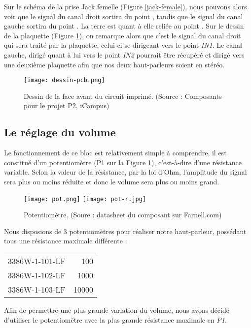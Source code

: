 Sur le schéma de la prise Jack femelle (Figure \ref{jack-female}), nous pouvons alors
voir que le signal du canal droit sortira du point , tandis que le signal du 
canal gauche sortira du point . La terre est quant à elle reliée au point
. Sur le dessin de la plaquette (Figure \ref{dessin-pcb}), on remarque alors
que c'est le signal du canal droit qui sera traité par la plaquette, celui-ci se dirigeant vers
le point \textit{IN1}. Le canal gauche, dirigé quant à lui vers le point \textit{IN2} pourrait
être récupéré et dirigé vers une deuxième plaquette afin que nos deux haut-parleurs soient en stéréo.

\begin{figure}[!hbt]
	\centering
	\texttt{[image: dessin-pcb.png]}
	\caption{Dessin de la face avant du circuit imprimé. (Source : Composants pour le projet P2, iCampus)}
	\label{dessin-pcb}
\end{figure}

\subsection{Le réglage du volume}
Le fonctionnement de ce bloc est relativement simple à comprendre, il est constitué d'un potentiomètre 
(P1 sur la Figure \ref{dessin-pcb}), c'est-à-dire d'une résistance variable.
Selon la valeur de la résistance, par la loi d'Ohm, l'amplitude du signal
sera plus ou moins réduite et donc le volume sera plus ou moins grand.

\begin{figure}[h]
	\centering
	\texttt{[image: pot.png]}
	\texttt{[image: pot-r.jpg]}
	\caption{Potentiomètre. (Soure : datasheet du composant sur Farnell.com)}
	\label{bloc2}
\end{figure}

Nous disposions de 3 potentiomètres pour réaliser notre haut-parleur, possédant
tous une résistance maximale différente :

\begin{center}
	\begin{tabular}{l|r}
	3386W-1-101-LF & \unit{100}{\ohm} \\
	3386W-1-102-LF & \unit{1000}{\ohm} \\
	3386W-1-103-LF & \unit{10000}{\ohm} 
	\end{tabular}
\end{center}

Afin de permettre une plus grande variation du volume, nous avons décidé d'utiliser
le potentiomètre avec la plus grande résistance maximale en \textit{P1}.

